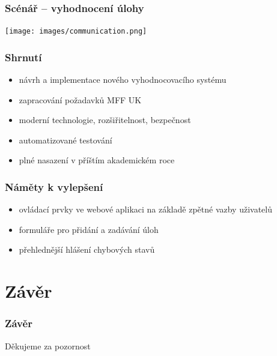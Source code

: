 \documentclass{beamer}
\begin{document}
\begin{frame}
	\frametitle{Scénář -- vyhodnocení úlohy}
	\begin{center}
		\texttt{[image: images/communication.png]}
	\end{center}
\end{frame}

\begin{frame}
	\frametitle{Shrnutí}
	\begin{itemize}
		\item návrh a implementace nového vyhodnocovacího systému
		\item zapracování požadavků MFF UK
		\item moderní technologie, rozšiřitelnost, bezpečnost
		\item automatizované testování
		\item plné nasazení v příštím akademickém roce
	\end{itemize}
\end{frame}

\begin{frame}
	\frametitle{Náměty k vylepšení}
	\begin{itemize}
		\item ovládací prvky ve webové aplikaci na základě zpětné vazby uživatelů
		\item formuláře pro přidání a zadávání úloh
		\item přehlednější hlášení chybových stavů
	\end{itemize}
\end{frame}

\section{Závěr}
\begin{frame}
	\frametitle{Závěr}
	\centering
	\LARGE{Děkujeme za pozornost}
\end{frame}
\end{document}
